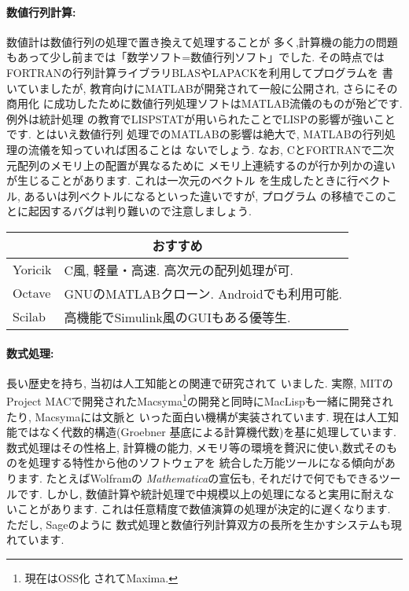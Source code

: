\documentclass[b5j,8pt,twocolumn]{ltjsarticle}
\begin{document}
\paragraph{数値行列計算:} 数値計は数値行列の処理で置き換えて処理することが
多く,計算機の能力の問題もあって少し前までは「数学ソフト=数値行列ソフト」でした.
 その時点ではFORTRANの行列計算ライブラリBLASやLAPACKを利用してプログラムを
書いていましたが, 教育向けにMATLABが開発されて一般に公開され, さらにその商用化
に成功したために数値行列処理ソフトはMATLAB流儀のものが殆どです. 例外は統計処理
の教育でLISPSTATが用いられたことでLISPの影響が強いことです. とはいえ数値行列
処理でのMATLABの影響は絶大で, MATLABの行列処理の流儀を知っていれば困ることは
ないでしょう. なお, CとFORTRANで二次元配列のメモリ上の配置が異なるために
メモリ上連続するのが行か列かの違いが生じることがあります. これは一次元のベクトル
を生成したときに行ベクトル, あるいは列ベクトルになるといった違いですが, プログラム
の移植でこのことに起因するバグは判り難いので注意しましょう.

\vspace{0.5cm}
{\footnotesize
\begin{tabularx}{7cm}{l X}
\multicolumn{2}{c}{おすすめ}\\\hline
Yoricik& C風, 軽量・高速. 高次元の配列処理が可.\\
Octave& GNUのMATLABクローン. Androidでも利用可能.\\
Scilab& 高機能でSimulink風のGUIもある優等生.\\\hline
\end{tabularx}
}
\vspace{0.5cm}

\paragraph{数式処理:} 長い歴史を持ち, 当初は人工知能との関連で研究されて
いました. 実際, MITのProject MACで開発されたMacsyma\footnote{現在はOSS化
されてMaxima.}の開発と同時にMacLispも一緒に開発されたり, Macsymaには文脈と
いった面白い機構が実装されています. 現在は人工知能ではなく代数的構造(Groebner
基底による計算機代数)を基に処理しています. 数式処理はその性格上, 計算機の能力,
 メモリ等の環境を贅沢に使い,数式そのものを処理する特性から他のソフトウェアを
統合した万能ツールになる傾向があります. たとえばWolframの
\textit{Mathematica}の宣伝も, それだけで何でもできるツールです. しかし,
 数値計算や統計処理で中規模以上の処理になると実用に耐えないことがあります.
 これは任意精度で数値演算の処理が決定的に遅くなります. ただし, Sageのように
数式処理と数値行列計算双方の長所を生かすシステムも現れています.
\end{document}
